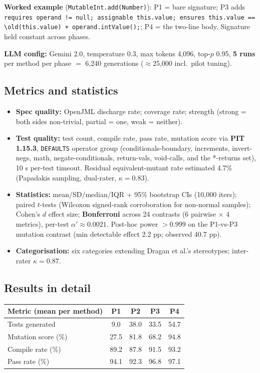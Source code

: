 \documentclass[11pt]{article}
\begin{document}
\textbf{Worked example} (\texttt{MutableInt.add(Number)}): P1 = bare
signature; P3 adds \texttt{requires operand != null; assignable this.value;
ensures this.value == \textbackslash old(this.value) + operand.intValue();};
P4 = the two-line body. Signature held constant across phases.

\textbf{LLM config:} Gemini 2.0, temperature 0.3, max tokens 4{,}096,
top-$p$ 0.95, \textbf{5 runs} per method per phase $=$ 6{,}240 generations
($\approx$25{,}000 incl.\ pilot tuning).

\subsection{Metrics and statistics}

\begin{itemize}[leftmargin=1.4em,itemsep=0.05em]
  \item \textbf{Spec quality:} OpenJML discharge rate; coverage rate; strength
        (strong = both sides non-trivial, partial = one, weak = neither).
  \item \textbf{Test quality:} test count, compile rate, pass rate, mutation
        score via \textbf{PIT 1.15.3}, \texttt{DEFAULTS} operator group
        (conditionals-boundary, increments, invert-negs, math,
        negate-conditionals, return-vals, void-calls, and the *-returns set),
        10 s per-test timeout. Residual equivalent-mutant rate estimated 4.7\%
        (Papadakis sampling, dual-rater, $\kappa = 0.83$).
  \item \textbf{Statistics:} mean/SD/median/IQR + 95\% bootstrap CIs
        (10{,}000 iters); paired $t$-tests (Wilcoxon signed-rank corroboration
        for non-normal samples); Cohen's $d$ effect size; \textbf{Bonferroni}
        across 24 contrasts (6 pairwise $\times$ 4 metrics), per-test
        $\alpha' \approx 0.0021$. Post-hoc power $> 0.999$ on the P1-vs-P3
        mutation contrast (min detectable effect 2.2 pp; observed 40.7 pp).
  \item \textbf{Categorisation:} six categories extending Dragan et al.'s
        stereotypes; inter-rater $\kappa = 0.87$.
\end{itemize}

\subsection{Results in detail}

\begin{center}
\begin{tabular}{lcccc}
\toprule
\textbf{Metric (mean per method)} & \textbf{P1} & \textbf{P2} & \textbf{P3} & \textbf{P4}\\
\midrule
Tests generated      & 9.0  & 38.0 & 33.5 & 54.7\\
Mutation score (\%)  & 27.5 & 81.8 & 68.2 & 94.8\\
Compile rate (\%)    & 89.2 & 87.8 & 91.5 & 93.2\\
Pass rate (\%)       & 94.1 & 92.3 & 96.8 & 97.1\\
\bottomrule
\end{tabular}
\end{center}
\end{document}
